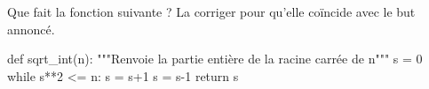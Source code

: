 Que fait la fonction suivante ? La corriger pour qu'elle coïncide avec le but annoncé. 

\begin{pyverbatim}
def sqrt_int(n):
    """Renvoie la partie entière de la racine carrée de n"""
    s = 0
    while s**2 <= n:
        s = s+1
        s = s-1
    return s
\end{pyverbatim}
